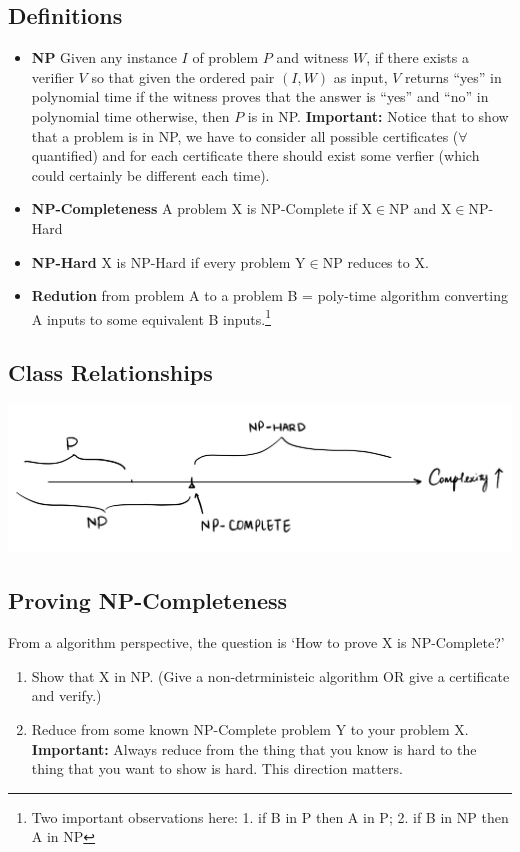 \documentclass[10pt]{article}
\begin{document}
\subsection{Definitions}
\begin{itemize}
    \item \textbf{NP} Given any instance $I$ of problem $P$ and witness $W$, if there exists a verifier $V$ so that given the ordered pair $(I, W)$ as input, $V$ returns ``yes'' in polynomial time if the witness proves that the answer is ``yes'' and ``no'' in polynomial time otherwise, then $P$ is in NP. \textbf{Important:} Notice that to show that a problem is in NP, we have to consider all possible certificates ($\forall$ quantified) and for each certificate there should exist some verfier (which could certainly be different each time). 
    \item \textbf{NP-Completeness} A problem X is NP-Complete if X$\in$NP and X$\in $NP-Hard
    \item \textbf{NP-Hard} X is NP-Hard if every problem Y$\in$NP reduces to X.
    \item \textbf{Redution} from problem A to a problem B = poly-time algorithm converting A inputs to some equivalent B inputs.\footnote{Two important observations here: 1. if B in P then A in P; 2. if B in NP then A in NP}
\end{itemize}

\subsection{Class Relationships}
\begin{center}
    \includegraphics[scale=0.16]{img/compare_complexities.jpg}
\end{center}

\subsection{Proving NP-Completeness}
From a algorithm perspective, the question is `How to prove X is NP-Complete?'
\begin{enumerate}
    \item Show that X in NP. (Give a non-detrministeic algorithm OR give a certificate and verify.)
    \item Reduce from some known NP-Complete problem Y to your problem X. \textbf{Important:} Always reduce from the thing that you know is hard to the thing that you want to show is hard. This direction matters. 
\end{enumerate}
\end{document}
